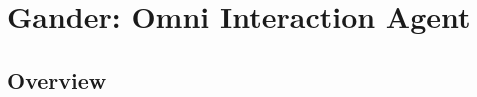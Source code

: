 \section{Gander: Omni Interaction Agent} \label{sec:e_bench}


\subsection{Overview} \label{subsec:e_bench_overview}







